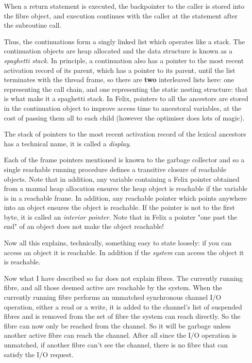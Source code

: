 \documentclass[oneside]{book}
\begin{document}
When a return statement is executed, the backpointer to the
caller is stored into the fibre object, and execution continues
with the caller at the statement after the subroutine call.

Thus, the continuations form a singly linked list which operates
like a stack. The continuation objects are heap allocated and
the data structure is known as a {\em spaghetti stack}.
In principle, a continuation also has a pointer to the most recent
activation record of its parent, which has a pointer to its 
parent, until the list terminates with the thread frame,
so there are {\bf two} interleaved lists here: one representing
the call chain, and one representing the static nesting structure:
that is what make it a spaghetti stack. In Felix, pointers to all
the ancestors are stored in the continuation object to improve
access time to ancestoral variables, at the cost of passing them
all to each child (however the optimiser does lots of magic).

The stack of pointers to the most recent activation record
of the lexical ancestors has a technical name, it is called
a {\em display}.

Each of the frame pointers mentioned is known to the garbage collector
and so a single reachable running procedure defines a transitive
closure of reachable objects. Note that in addition, any variable
containing a Felix pointer obtained from a manual heap allocation
ensures the heap object is reachable if the variable is in a 
reachable frame. In addition, any reachable pointer which points
anywhere into an object ensures the object is reachable.
If the pointer is not to the first byte, it is called
an {\em interior pointer}. Note that in Felix a pointer
"one past the end" of an object does not make the object
reachable!

Now all this explains, technically, something easy to state
loosely: if you can access an object it is reachable.
In addition if the {\em system} can access the object it
is reachable.

Now what I have described so far does not explain fibres.
The currently running fibre, and all those deemed active
are reachable by the system. When the currently running fibre
performs an unmatched synchronous channel I/O operation,
either a read or a write, it is added to the channel's
list of suspended fibres and is removed from the set of
fibre the system can reach directly. So the fibre can now
only be reached from the channel. So it will be garbage
unless another active fibre can reach the channel.
After all since the I/O operation is unmatched, if another
fibre can't see the channel, there is no fibre that
can satisfy the I/O request.
\end{document}
